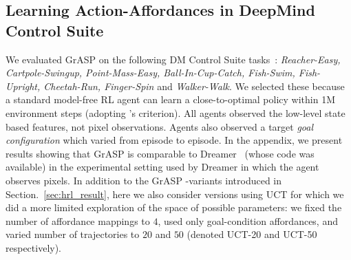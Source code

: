 \documentclass[nohyperref]{article}
\theoremstyle{plain}
\theoremstyle{definition}
\theoremstyle{remark}
\newcommand{\grasp}{{G}r{ASP} }
\begin{document}
\subsection{Learning Action-Affordances in DeepMind Control Suite} \label{sec:dm_control_expt}
We evaluated \grasp
on the following DM Control Suite tasks~\citep{tassa2018deepmind}: \emph{Reacher-Easy, Cartpole-Swingup, Point-Mass-Easy, Ball-In-Cup-Catch, Fish-Swim, Fish-Upright, Cheetah-Run, Finger-Spin} and \emph{Walker-Walk}. 
We selected these because a standard model-free RL agent can learn a close-to-optimal policy within 1M environment steps (adopting %
\citet{srinivas2020curl}'s criterion). All agents 
observed the low-level state based features,  not pixel observations. Agents also observed a target \emph{goal configuration} which varied from episode to episode. In the appendix, we present results 
showing that \grasp is comparable to Dreamer~\citep{hafner2019learning} (whose code was available) in the %
experimental setting used by Dreamer in which the agent observes pixels.
In addition to the \grasp-variants introduced in Section.~\ref{sec:hrl_result}, here we also consider versions using UCT for which we did a more limited exploration of the space of possible parameters: we fixed the number of affordance mappings to $4$, used only goal-condition affordances, and varied number of trajectories to $20$ and $50$ (denoted UCT-20 and UCT-50 respectively).
\end{document}
